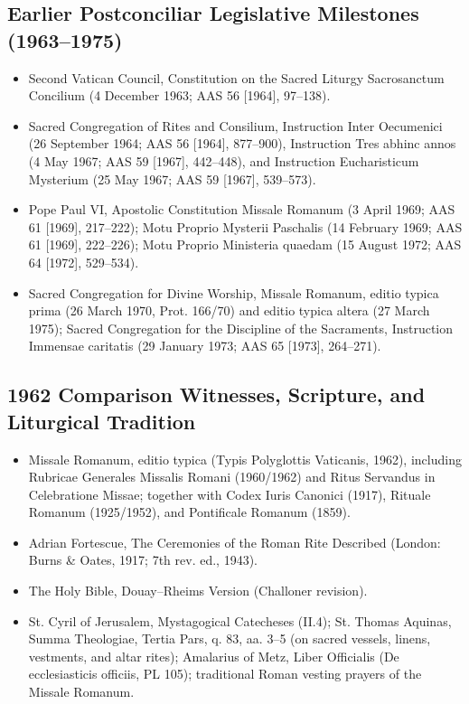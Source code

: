 \subsection*{Earlier Postconciliar Legislative Milestones (1963--1975)}
\begin{itemize}
\item Second Vatican Council, Constitution on the Sacred Liturgy Sacrosanctum Concilium (4 December 1963; AAS 56 [1964], 97--138).
\item Sacred Congregation of Rites and Consilium, Instruction Inter Oecumenici (26 September 1964; AAS 56 [1964], 877--900), Instruction Tres abhinc annos (4 May 1967; AAS 59 [1967], 442--448), and Instruction Eucharisticum Mysterium (25 May 1967; AAS 59 [1967], 539--573).
\item Pope Paul VI, Apostolic Constitution Missale Romanum (3 April 1969; AAS 61 [1969], 217--222); Motu Proprio Mysterii Paschalis (14 February 1969; AAS 61 [1969], 222--226); Motu Proprio Ministeria quaedam (15 August 1972; AAS 64 [1972], 529--534).
\item Sacred Congregation for Divine Worship, Missale Romanum, editio typica prima (26 March 1970, Prot. 166/70) and editio typica altera (27 March 1975); Sacred Congregation for the Discipline of the Sacraments, Instruction Immensae caritatis (29 January 1973; AAS 65 [1973], 264--271).
\end{itemize}
\subsection*{1962 Comparison Witnesses, Scripture, and Liturgical Tradition}
\begin{itemize}
\item Missale Romanum, editio typica (Typis Polyglottis Vaticanis, 1962), including Rubricae Generales Missalis Romani (1960/1962) and Ritus Servandus in Celebratione Missae; together with Codex Iuris Canonici (1917), Rituale Romanum (1925/1952), and Pontificale Romanum (1859).
\item Adrian Fortescue, The Ceremonies of the Roman Rite Described (London: Burns \& Oates, 1917; 7th rev. ed., 1943).
\item The Holy Bible, Douay--Rheims Version (Challoner revision).
\item St. Cyril of Jerusalem, Mystagogical Catecheses (II.4); St. Thomas Aquinas, Summa Theologiae, Tertia Pars, q. 83, aa. 3--5 (on sacred vessels, linens, vestments, and altar rites); Amalarius of Metz, Liber Officialis (De ecclesiasticis officiis, PL 105); traditional Roman vesting prayers of the Missale Romanum.
\end{itemize}
